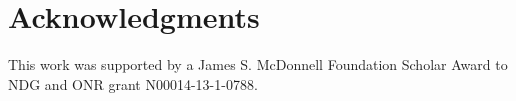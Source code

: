 \documentclass[10pt,letterpaper]{article}
\newcommand{\w}[1]{\emph{#1}}
\newcommand{\todo}[1]{{\color{red}#1}}
\begin{document}



\section{Acknowledgments} %

This work was supported by a James S. McDonnell Foundation Scholar Award to NDG and ONR grant N00014-13-1-0788.



\setlength{\bibleftmargin}{.125in}
\setlength{\bibindent}{-\bibleftmargin}


\end{document}
